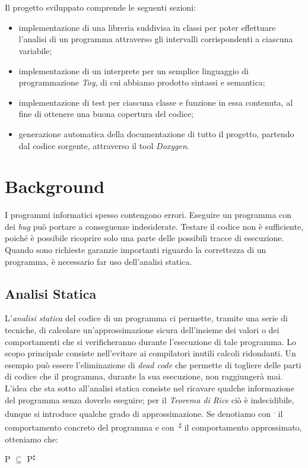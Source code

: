 \documentclass[a4paper, 10pt]{report}
\begin{document}
\\\\
Il progetto sviluppato comprende le seguenti sezioni:
\begin{itemize}
	\item implementazione di una libreria suddivisa in classi per poter effettuare l'analisi di un programma attraverso gli intervalli corrispondenti a ciascuna variabile;
	\item implementazione di un interprete per un semplice linguaggio di programmazione \textit{Toy}, di cui abbiamo prodotto sintassi e semantica;
	\item implementazione di test per ciascuna classe e funzione in essa contenuta, al fine di ottenere una buona copertura del codice;
	\item generazione automatica della documentazione di tutto il progetto, partendo dal codice sorgente, attraverso il tool \textit{Doxygen}.
\end{itemize}


\chapter*{Background}
I programmi informatici spesso contengono errori. Eseguire un programma con dei \textit{bug} può portare a conseguenze indesiderate.
Testare il codice non è sufficiente, poiché è possibile ricoprire solo una parte delle possibili tracce di esecuzione. Quando sono richieste garanzie importanti riguardo la correttezza di un programma, è necessario far uso dell'analisi statica.\\

\section*{Analisi Statica}
L'\textit{analisi statica} del codice di un programma ci permette, tramite una serie di tecniche, di calcolare un'approssimazione sicura dell'insieme dei valori o dei comportamenti che si verificheranno durante l'esecuzione di tale programma. Lo scopo principale consiste nell'evitare ai compilatori inutili calcoli ridondanti. Un esempio può essere l'eliminazione di \textit{dead code} che permette di togliere delle parti di codice che il programma, durante la sua esecuzione, non raggiungerà mai.
\\
L'idea che sta sotto all'analisi statica consiste nel ricavare qualche informazione del programma senza doverlo eseguire; per il \textit{Teorema di Rice} ciò è indecidibile, dunque si introduce qualche grado di approssimazione. Se denotiamo con \textlbrackdbl \textsuperscript{.}\textrbrackdbl\hspace{0.01cm} il comportamento concreto del programma e con \textlbrackdbl \textsuperscript{.}\textrbrackdbl\textsuperscript{$\sharp$} il comportamento approssimato, otteniamo che:
\begin{center}
	\textlbrackdbl P\textrbrackdbl\hspace{0.01cm} $\subseteq$ \textlbrackdbl P\textrbrackdbl\textsuperscript{$\sharp$}
\end{center}
\end{document}
